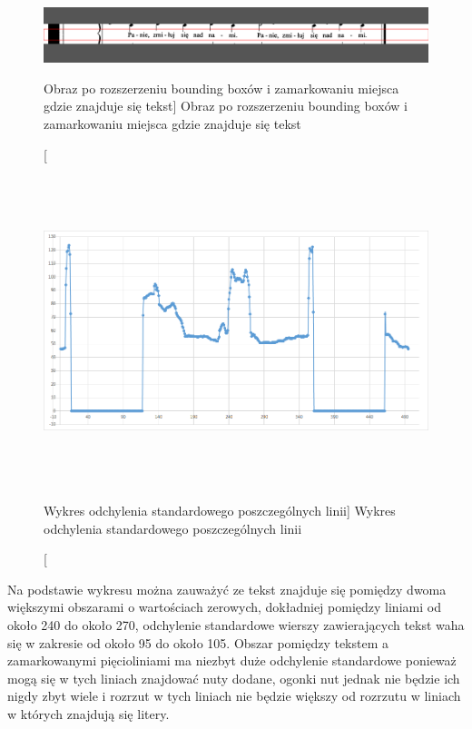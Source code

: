 \documentclass[a4paper,12pt]{article}
\begin{document}
		        \begin{figure}[!ht]  
			        \begin{center}
				        \includegraphics[width=16.5cm, frame] {image//exampleImage//005_b.png} 
			        \end{center}
			        \caption
    			        [Obraz po rozszerzeniu bounding boxów i zamarkowaniu miejsca gdzie znajduje się tekst]  
    			        {Obraz po rozszerzeniu bounding boxów i zamarkowaniu miejsca gdzie znajduje się tekst}  
		        \end{figure} 
		    \newpage
		        \begin{figure}[!ht]  
			        \begin{center}
				        \includegraphics[height=9cm, frame] {image//practicalPart//stdDevDetectText.png} 
			        \end{center}
			        \caption
        			    [Wykres odchylenia standardowego poszczególnych linii]  
        			    {Wykres odchylenia standardowego poszczególnych linii}  
		        \end{figure}
		    
		    Na podstawie wykresu można zauważyć ze tekst znajduje się pomiędzy dwoma większymi obszarami o wartościach zerowych, dokładniej pomiędzy liniami od około 240 do około 270, odchylenie standardowe wierszy zawierających tekst waha się w zakresie od około 95 do około 105. Obszar pomiędzy tekstem a zamarkowanymi pięcioliniami ma niezbyt duże odchylenie standardowe ponieważ mogą się w tych liniach znajdować nuty dodane, ogonki nut jednak nie będzie ich nigdy zbyt wiele i rozrzut w tych liniach nie będzie większy od rozrzutu w liniach w których znajdują się litery.
\end{document}
